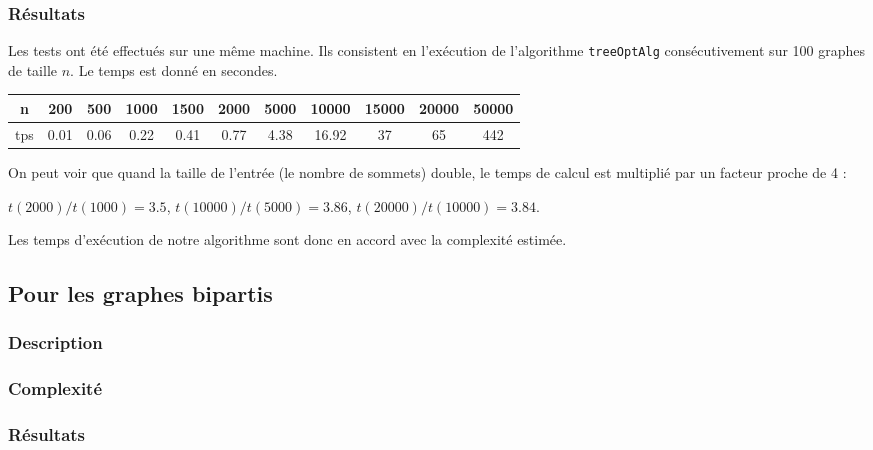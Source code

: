 \documentclass[a4paper,10pt]{article}
\begin{document}
\subsubsection{Résultats}

Les tests ont été effectués sur une même machine. Ils consistent en l'exécution de l'algorithme \texttt{treeOptAlg} consécutivement sur 100 graphes de taille $n$. Le temps est donné en secondes.
\begin{center}
\begin{tabular}{|c|c|c|c|c|c|c|c|c|c|c|}
	\hline 
	n & 200 & 500 & 1000 & 1500 & 2000 & 5000 & 10000 & 15000 & 20000 & 50000 \\
	\hline
	tps & 0.01 & 0.06 & 0.22 & 0.41 & 0.77 & 4.38 & 16.92 & 37 & 65 & 442 \\
	\hline
\end{tabular}
\end{center}

On peut voir que quand la taille de l'entrée (le nombre de sommets) double, le temps de calcul est multiplié par un facteur proche de 4 :

$t(2000)/t(1000) = 3.5$, $t(10000)/t(5000) = 3.86$, $t(20000)/t(10000) = 3.84$.

Les temps d'exécution de notre algorithme sont donc en accord avec la complexité estimée.

\subsection{Pour les graphes bipartis}

\subsubsection{Description}


\subsubsection{Complexité}


\subsubsection{Résultats}
\end{document}
